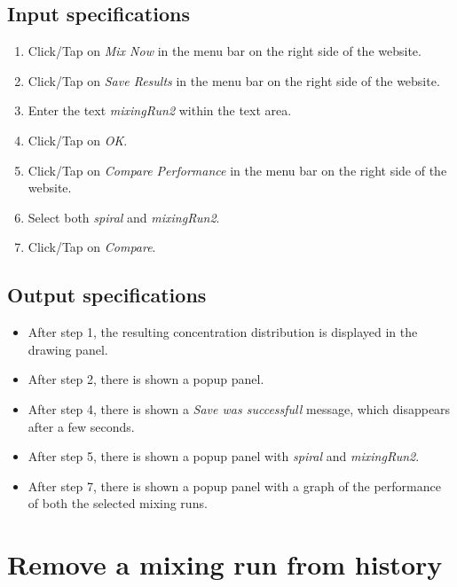 \subsection*{Input specifications}
\begin{enumerate}
\item Click/Tap on \emph{Mix Now} in the menu bar on the right side of the website.
\item Click/Tap on \emph{Save Results} in the menu bar on the right side of the website.
\item Enter the text \emph{mixingRun2} within the text area.
\item Click/Tap on \emph{OK}.
\item Click/Tap on \emph{Compare Performance} in the menu bar on the right side of the website.
\item Select both \emph{spiral} and \emph{mixingRun2}.
\item Click/Tap on \emph{Compare}.
\end{enumerate}

\subsection*{Output specifications}
\begin{itemize}
\item After step 1, the resulting concentration distribution is displayed in the drawing panel.
\item After step 2, there is shown a popup panel.
\item After step 4, there is shown a \emph{Save was successfull} message, which disappears after a few seconds.
\item After step 5, there is shown a popup panel with \emph{spiral} and \emph{mixingRun2}.
\item After step 7, there is shown a popup panel with a graph of the performance of both the selected mixing runs.
\end{itemize}
 
\section{Remove a mixing run from history}

